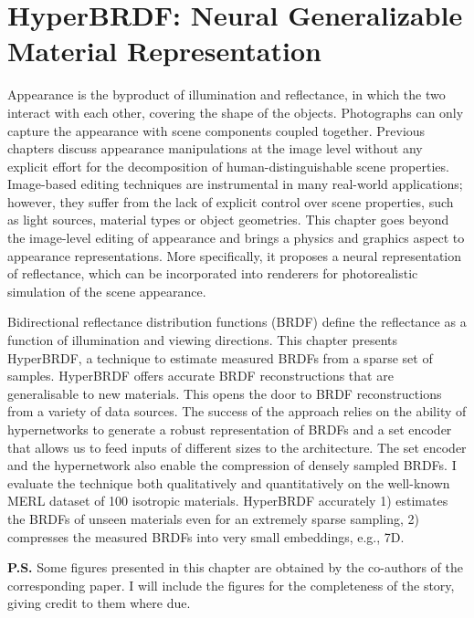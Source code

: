 \chapter{HyperBRDF: Neural Generalizable Material Representation}
\label{ch:HyperBRDF}

Appearance is the byproduct of illumination and reflectance, in which the two interact with each other, covering the shape of the objects. Photographs can only capture the appearance with scene components coupled together. Previous chapters discuss appearance manipulations at the image level without any explicit effort for the decomposition of human-distinguishable scene properties. Image-based editing techniques are instrumental in many real-world applications; however, they suffer from the lack of explicit control over scene properties, such as light sources, material types or object geometries. This chapter goes beyond the image-level editing of appearance and brings a physics and graphics aspect to appearance representations. More specifically, it proposes a neural representation of reflectance, which can be incorporated into renderers for photorealistic simulation of the scene appearance.

Bidirectional reflectance distribution functions (\gls{BRDF}) define the reflectance as a function of illumination and viewing directions. This chapter presents HyperBRDF, a technique to estimate measured BRDFs from a sparse set of samples. HyperBRDF offers accurate BRDF reconstructions that are generalisable to new materials. This opens the door to BRDF reconstructions from a variety of data sources. The success of the approach relies on the ability of hypernetworks to generate a robust representation of BRDFs and a set encoder that allows us to feed inputs of different sizes to the architecture. The set encoder and the hypernetwork also enable the compression of densely sampled BRDFs. I evaluate the technique both qualitatively and quantitatively on the well-known MERL dataset of 100 isotropic materials. HyperBRDF accurately 1) estimates the BRDFs of unseen materials even for an extremely sparse sampling, 2) compresses the measured BRDFs into very small embeddings, e.g., 7D. 

\textbf{P.S.} Some figures presented in this chapter are obtained by the co-authors of the corresponding paper. I will include the figures for the completeness of the story, giving credit to them where due. 









